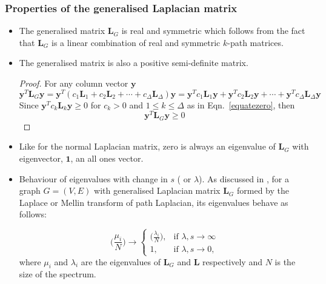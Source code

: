 \documentclass[10pt,a4paper]{article}
\theoremstyle{plain}
\theoremstyle{definition}
\begin{document}
        \subsubsection{Properties of the generalised Laplacian matrix }
        \begin{itemize}
        	\item The generalised matrix $\mathbf{L}_G$ is real and symmetric which follows from the fact that $\mathbf{L}_G$ is a linear combination of real and symmetric $k$-path matrices. 
        	
        	\item The generalised matrix is also a positive semi-definite matrix. 
        	\begin{proof}
        		For any column vector $\mathbf{y}$
        		\begin{equation}
        		\mathbf{y}^T \mathbf{L}_{G} \mathbf{y} = \mathbf{y}^T(c_{1}\mathbf{L}_{1} + c_{2}\mathbf{L}_{2} + \cdots + c_{\Delta}\mathbf{L}_{\Delta} )\mathbf{y}
        		= \mathbf{y}^Tc_{1}\mathbf{L}_{1}\mathbf{y} + \mathbf{y}^Tc_{2}\mathbf{L}_{2}\mathbf{y} + \cdots + \mathbf{y}^Tc_{\Delta}\mathbf{L}_{\Delta}\mathbf{y} 
        		\end{equation}
        		Since $\mathbf{y}^Tc_{k}\mathbf{L}_{k}\mathbf{y} \geq 0$ for $c_{k}>0$ and $1 \leq k \leq \Delta$ as in Eqn.~\ref{equatezero}, then
        		\begin{equation}
        		\mathbf{y}^T \mathbf{L}_{G} \mathbf{y} \geq 0	
        		\end{equation}
        	\end{proof}
        	\item Like for the normal Laplacian matrix, zero is always an eigenvalue of $\mathbf{L}_G$ with eigenvector, $\mathbf{1}$, an all ones vector.
        	\item Behaviour of eigenvalues with change in $s$ ( or $\lambda$). As discussed in \citep{estrada2017long}, for a graph $G=(V,E)$  with generalised Laplacian matrix $\mathbf{L}_G$ formed by the Laplace or Mellin transform of path Laplacian, its eigenvalues behave as follows:
        	
        	\begin{equation}
        	\bigg(\frac{\mu_i}{N} \bigg) \longrightarrow  \begin{cases} 
        	\Big(\frac{\lambda_i}{N} \Big), & \mbox{if } \lambda,s \longrightarrow \infty \\
        	1,  &\mbox{if } \lambda,s \longrightarrow 0,
        	\end{cases}
        	\end{equation}
        	where $\mu_i$ and $\lambda_i$ are the eigenvalues of $\mathbf{L}_G$ and $\mathbf{L}$ respectively and $N$ is the size of the spectrum.
        \end{itemize}
    
\end{document}
